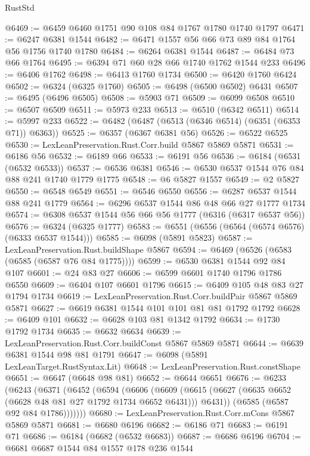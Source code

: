 \begin{lexlean}{RustStd}
\begin{coremodule}
@6469 := @6459 @6460 @1751 @90 @108 @84 @1767 @1780 @1740 @1797
@6471 := @6247 @6381 @1544
@6482 := @6471 @1557 @56 @66 @73 @89 @84 @1764 @56 @1756 @1740 @1780
@6484 := @6264 @6381 @1544
@6487 := @6484 @73 @66 @1764
@6495 := @6394 @71 @60 @28 @66 @1740 @1762 @1544 @233
@6496 := @6406 @1762
@6498 := @6413 @1760 @1734
@6500 := @6420 @1760 @6424
@6502 := @6324 (@6325 @1760)
@6505 := @6498 (@6500 @6502) @6431
@6507 := @6495 (@6496 @6505)
@6508 := @5903 @71
@6509 := @6099 @6508
@6510 := @6507 @6509
@6511 := @5973 @233
@6513 := @6510 (@6342 @6511)
@6514 := @5997 @233
@6522 := @6482 (@6487 (@6513 (@6346 @6514) (@6351 (@6353 @71)) @6363))
@6525 := @6357 (@6367 @6381 @56)
@6526 := @6522 @6525
@6530 := LexLeanPreservation.Rust.Corr.build @5867 @5869 @5871
@6531 := @6186 @56
@6532 := @6189 @66
@6533 := @6191 @56
@6536 := @6184 (@6531 (@6532 @6533))
@6537 := @6536 @6381
@6546 := @6530 @6537 @1544 @76 @84 @88 @241 @1740 @1779 @1775
@6548 := @6 @5827 @1557
@6549 := @2 @5827
@6550 := @6548 @6549
@6551 := @6546 @6550
@6556 := @6287 @6537 @1544 @88 @241 @1779
@6564 := @6296 @6537 @1544 @86 @48 @66 @27 @1777 @1734
@6574 := @6308 @6537 @1544 @56 @66 @56 @1777 (@6316 (@6317 @6537 @56))
@6576 := @6324 (@6325 @1777)
@6583 := @6551 (@6556 (@6564 (@6574 @6576) (@6333 @6537 @1544)))
@6585 := @6098 (@5891 @5823)
@6587 := LexLeanPreservation.Rust.buildShape @5867
@6594 := @6469 (@6526 (@6583 (@6585 (@6587 @76 @84 @1775))))
@6599 := @6530 @6381 @1544 @92 @84 @107
@6601 := @24 @83 @27
@6606 := @6599 @6601 @1740 @1796 @1786 @6550
@6609 := @6404 @107 @6601 @1796
@6615 := @6409 @105 @48 @83 @27 @1794 @1734
@6619 := LexLeanPreservation.Rust.Corr.buildPair @5867 @5869 @5871
@6627 := @6619 @6381 @1544 @101 @101 @81 @81 @1792 @1792
@6628 := @6409 @101
@6632 := @6628 @103 @81 @1342 @1792
@6634 := @1730 @1792 @1734
@6635 := @6632 @6634
@6639 := LexLeanPreservation.Rust.Corr.buildConst @5867 @5869 @5871
@6644 := @6639 @6381 @1544 @98 @81 @1791
@6647 := @6098 (@5891 LexLeanTarget.RustSyntax.Lit)
@6648 := LexLeanPreservation.Rust.constShape
@6651 := @6647 (@6648 @98 @81)
@6652 := @6644 @6651
@6676 := @6233
    (@6243
      (@6371
        (@6452
          (@6594
            (@6606
              (@6609
                (@6615 (@6627 (@6635 @6652 (@6628 @48 @81 @27 @1792 @1734 @6652 @6431))) @6431))
              (@6585 (@6587 @92 @84 @1786)))))))
@6680 := LexLeanPreservation.Rust.Corr.mCons @5867 @5869 @5871
@6681 := @6680 @6196
@6682 := @6186 @71
@6683 := @6191 @71
@6686 := @6184 (@6682 (@6532 @6683))
@6687 := @6686 @6196
@6704 := @6681
    @6687
    @1544
    @84
    @1557
    @178
    @236
    @1544

\end{coremodule}
\end{lexlean}

